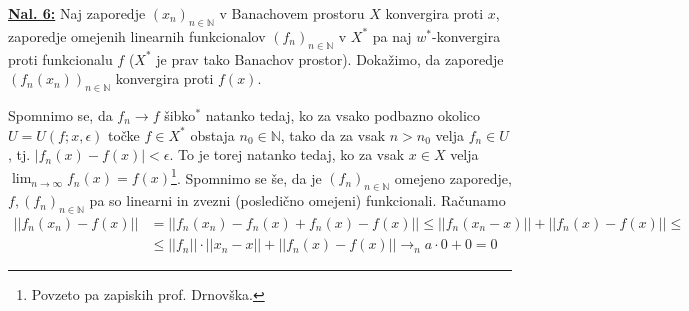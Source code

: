 \documentclass[a4paper, 12pt]{article}
\newcommand{\N}{\mathbb{N}}
\begin{document}
\underline{\textbf{Nal. 6:}}
Naj zaporedje $(x_n)_{n\in\N}$ v Banachovem prostoru $X$ konvergira proti $x$, zaporedje omejenih linearnih funkcionalov $(f_n)_{n\in\N}$ v $X^*$ pa naj $w^*$-konvergira proti funkcionalu $f$ ($X^*$ je prav tako Banachov prostor). Dokažimo, da zaporedje $(f_n(x_n))_{n\in\N}$ konvergira proti $f(x)$.

Spomnimo se, da $f_n \to f$ šibko$^*$ natanko tedaj, ko za vsako podbazno okolico $U = U(f; x, \epsilon)$ točke $f \in X^*$ obstaja $n_0 \in \N$, tako da za vsak $n > n_0$ velja $f_n \in U$, tj. $|f_n(x)-f(x)| < \epsilon$. To je torej natanko tedaj, ko za vsak $x \in X$ velja $\lim_{n \to \infty}f_n(x) = f(x)$\footnote{Povzeto pa zapiskih prof. Drnovška.}. Spomnimo se še, da je $(f_n)_{n\in\N}$ omejeno zaporedje, $f, (f_n)_{n\in\N}$ pa so linearni in zvezni (posledično omejeni) funkcionali. Računamo
\begin{align*}
|| f_n(x_n) - f(x) || &= || f_n(x_n) - f_n(x) + f_n(x) - f(x) || \leq || f_n(x_n - x) || + ||f_n(x) - f(x) || \leq \\
&\leq ||f_n||\cdot||x_n - x || + ||f_n(x) - f(x)|| \longrightarrow_n a\cdot 0 + 0 = 0
\end{align*}
\end{document}
